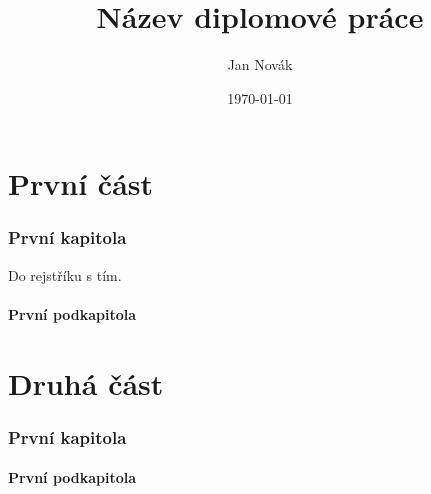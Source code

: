 \documentclass[12pt]{article}
\title{Název diplomové práce}
\author{Jan Novák}
\date{\today}
\begin{document}
\maketitle

\part{První část}
\section{První kapitola}
\lipsum[1-10]

Do rejstříku s tím.

\subsection{První podkapitola}
\lipsum[1-10]

\part{Druhá část}
\section{První kapitola}
\lipsum[1-10]

\subsection{První podkapitola}
\lipsum[1-10]


\printindex
\end{document}
